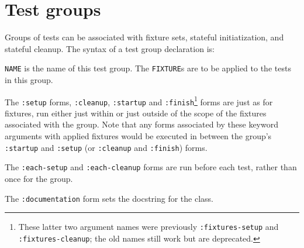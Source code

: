 
\section{Test groups}
\label{sec:groups}
Groups of tests can be
associated with fixture sets, stateful initiatization, and stateful
cleanup.  The syntax of a test group declaration
is:

%
\texttt{NAME} is the name of this test group.  The \texttt{FIXTURE}s
are to be applied to the tests in this group.

The \texttt{:setup} forms,
\texttt{:cleanup}, \texttt{:startup}
and \texttt{:finish}\footnote{These
  latter two argument names were previously
  \texttt{:fixtures-setup}
  and
  \texttt{:fixtures-cleanup};
  the old names still work but are deprecated.}  forms are just as for
fixtures, run either just within or just outside of the scope of the
fixtures associated with the group.  Note that any forms associated by
these keyword arguments with applied fixtures would be executed in
between the group's \texttt{:startup} and \texttt{:setup} (or
\texttt{:cleanup} and \texttt{:finish}) forms.

The \texttt{:each-setup}
and \texttt{:each-cleanup}
forms are run before each test, rather than once for the group.

The \texttt{:documentation}
form sets the docstring for the class.

